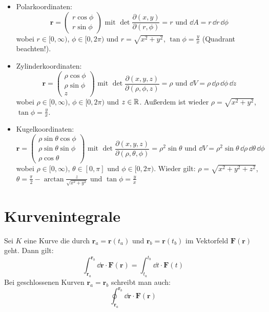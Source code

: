 \begin{framedprop}
	\begin{itemize}
		\item Polarkoordinaten:
		\[
		\mathbf{r} = \left(\begin{array}{c} r \cos\phi \\ r \sin\phi \end{array} \right) \textrm{ mit } \det \frac{\partial (x,y)}{\partial (r, \phi)} = r \textrm{ und } \dd A = r \, \dd r \, \dd \phi
		\]
		wobei $r \in [0, \infty)$, $\phi \in [0,2\pi)$ und $r = \sqrt{x^2 + y^2}$, $\tan\phi = \frac{y}{x}$ (Quadrant beachten!).
		\item Zylinderkoordinaten:
		\[
		\mathbf{r} = \left(\begin{array}{c} \rho \cos\phi \\ \rho \sin\phi \\ z \end{array} \right) \textrm{ mit } \det \frac{\partial (x,y,z)}{\partial (\rho, \phi, z)} = \rho \textrm{ und } \dd V = \rho \, \dd \rho \, \dd \phi \, \dd z
		\]
		wobei $\rho \in [0, \infty)$, $\phi \in [0,2\pi)$ und $z \in \mathbb{R}$. Außerdem ist wieder $\rho = \sqrt{x^2 + y^2}$, $\tan\phi = \frac{y}{x}$.
		\item Kugelkoordinaten:
		\[
		\mathbf{r} = \left(\begin{array}{c} \rho \sin\theta \cos\phi \\ \rho \sin\theta \sin\phi \\ \rho \cos\theta \end{array} \right) \textrm{ mit } \det \frac{\partial (x,y,z)}{\partial (\rho, \theta, \phi)} = \rho^2 \sin\theta \textrm{ und } \dd V = \rho^2 \sin\theta \, \dd \rho \, \dd \theta \, \dd \phi
		\]
		wobei $\rho \in [0, \infty)$, $\theta \in [0,\pi]$ und $\phi \in [0,2\pi)$. Wieder gilt: $\rho = \sqrt{x^2+y^2+z^2}$, $\theta = \frac{\pi}{2} - \arctan\frac{z}{\sqrt{x^2+y^2}}$ und $\tan\phi = \frac{y}{x}$
	\end{itemize}
\end{framedprop}

\newpage 
\section{Kurvenintegrale}

\begin{framedprop}
Sei $K$ eine Kurve die durch $\mathbf{r}_a = \mathbf{r}(t_a)$ und $\mathbf{r}_b = \mathbf{r}(t_b)$ im Vektorfeld $\mathbf{F}(\mathbf{r})$ geht. Dann gilt:
\[
\int_{\mathbf{r}_a}^{\mathbf{r}_b} \dd \mathbf{r} \cdot \mathbf{F}(\mathbf{r}) = \int_{t_a}^{t_b} \dd t \cdot \mathbf{F}(t)
\]
Bei geschlossenen Kurven $\mathbf{r}_a = \mathbf{r}_b$ schreibt man auch:
\[
\oint_{\mathbf{r}_a}^{\mathbf{r}_b} \dd \mathbf{r} \cdot \mathbf{F}(\mathbf{r})
\]
\end{framedprop}

